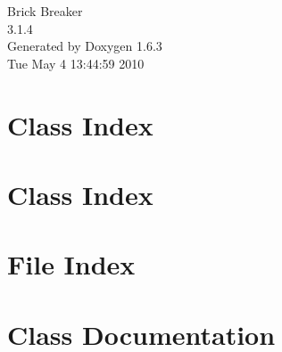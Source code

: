 \documentclass[a4paper]{book}
\begin{document}
\hypersetup{pageanchor=false}
\begin{titlepage}
\vspace*{7cm}
\begin{center}
{\Large Brick Breaker \\[1ex]\large 3.1.4 }\\
\vspace*{1cm}
{\large Generated by Doxygen 1.6.3}\\
\vspace*{0.5cm}
{\small Tue May 4 13:44:59 2010}\\
\end{center}
\end{titlepage}
\clearemptydoublepage
{}
\tableofcontents
\clearemptydoublepage
{}
\hypersetup{pageanchor=true}
\chapter{Class Index}

\chapter{Class Index}

\chapter{File Index}

\chapter{Class Documentation}



































\end{document}
